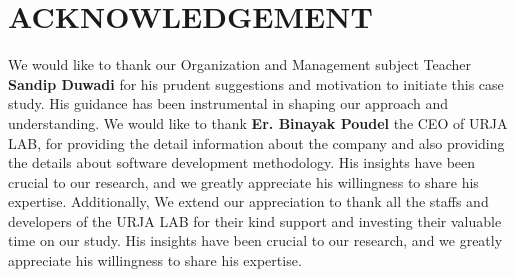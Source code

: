 \chapter*{ACKNOWLEDGEMENT}

\begin{justify}
    We would like to thank our Organization and Management subject Teacher \textbf{Sandip Duwadi} for his prudent suggestions and motivation to initiate this case study. His guidance has been instrumental in shaping our approach and understanding. We would like to thank \textbf{Er. Binayak Poudel} the CEO of URJA LAB, for providing the detail information about the company and also providing the details about software development methodology. His insights have been crucial to our research, and we greatly appreciate his willingness to share his expertise. Additionally, We extend our appreciation to thank all the staffs and developers of the URJA LAB for their kind support and investing their valuable time on our study. His insights have been crucial to our research, and we greatly appreciate his willingness to share his expertise.
\end{justify}
\newpage